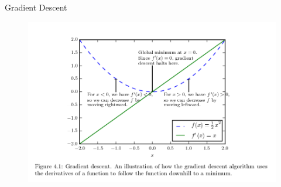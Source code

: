 \documentclass[handout]{beamer}
\begin{document}
\begin{frame}{Gradient Descent}
\begin{figure}[htb]
	\centering
	 \includegraphics[scale=0.45]{pics/gradientdescent.png}
\end{figure}


\end{frame}
\end{document}
